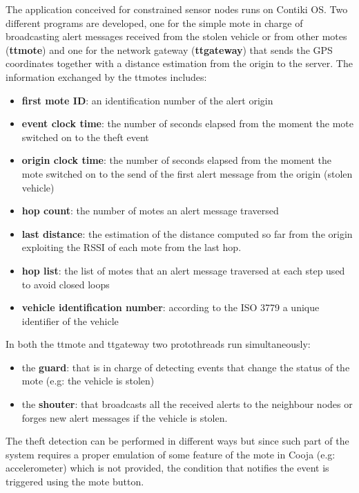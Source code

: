 \documentclass[]{article}
\begin{document}
The application conceived for constrained sensor nodes runs on Contiki OS. Two different programs are developed, one for the simple mote in charge of broadcasting alert messages received from the stolen vehicle or from other motes (\textbf{ttmote}) and one for the network gateway (\textbf{ttgateway}) that sends the GPS coordinates together with a distance estimation from the origin to the server. The information exchanged by the ttmotes includes:
\begin{itemize}
	\item \textbf{first mote ID}: an identification number of the alert origin
\end{itemize}
\newpage
\begin{itemize}
	\item \textbf{event clock time}: the number of seconds elapsed from the moment the mote switched on to the theft event 
	\item \textbf{origin clock time}: the number of seconds elapsed from the moment the mote switched on to the send of the first alert message from the origin (stolen vehicle) 
	\item\textbf{hop count}: the number of motes an alert message traversed
	\item \textbf{last distance}: the estimation of the distance computed so far from the origin exploiting the RSSI of each mote from the last hop.
	\item \textbf{hop list}: the list of motes that an alert message traversed at each step used to avoid closed loops
	\item \textbf{vehicle identification number}: according to the ISO 3779 a unique identifier of the vehicle
\end{itemize}
In both the ttmote and ttgateway two protothreads run simultaneously:
\begin{itemize}
	\item the \textbf{guard}: that is in charge of detecting events that change the status of the mote (e.g: the vehicle is stolen)
	\item the \textbf{shouter}: that broadcasts all the received alerts to the neighbour nodes or forges new alert messages if the vehicle is stolen.
\end{itemize}
The theft detection can be performed in different ways but since such part of the system requires a proper emulation of some feature of the mote in Cooja (e.g: accelerometer) which is not provided, the condition that notifies the event is triggered using the mote button.\par 
\end{document}
